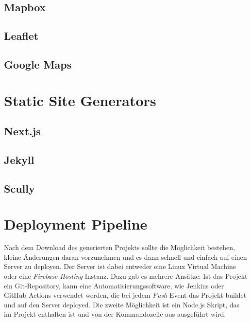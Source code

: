 \subsection{Mapbox}
\subsection{Leaflet}
\subsection{Google Maps}

\section{Static Site Generators}
\subsection{Next.js}
\subsection{Jekyll}
\subsection{Scully}

\section{Deployment Pipeline}
Nach dem Download des generierten Projekts sollte die Möglichkeit bestehen,
kleine Änderungen daran vorzunehmen und es dann schnell und einfach auf einen
Server zu deployen. Der Server ist dabei entweder eine Linux Virtual Machine
oder eine \textit{Firebase Hosting} Instanz.
Dazu gab es mehrere Ansätze: Ist das Projekt ein Git-Repository, kann eine
Automatisierungssoftware, wie Jenkins oder GitHub Actions verwendet werden,
die bei jedem \textit{Push}-Event das Projekt buildet und auf den Server
deployed. Die zweite Möglichkeit ist ein Node.js Skript, das im Projekt
enthalten ist und von der Kommandozeile aus ausgeführt wird.
